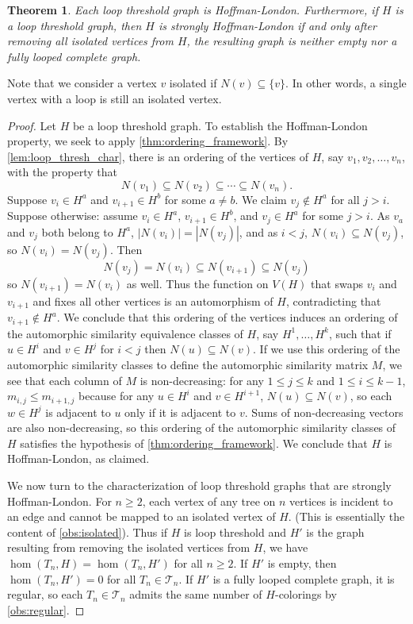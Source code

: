 \documentclass[11pt]{article}
\newtheorem{theorem}{Theorem}[section]
\theoremstyle{definition}
\begin{document}
\begin{theorem}\label{thm:loop_threshold}
Each loop threshold graph is Hoffman-London. Furthermore, if $H$ is a loop threshold graph, then $H$ is strongly Hoffman-London if and only after removing all isolated vertices from $H$, the resulting graph is neither empty nor a fully looped complete graph.
\end{theorem}

Note that we consider a vertex $v$ isolated if $N(v) \subseteq \{v\}$. In other words, a single vertex with a loop is still an isolated vertex.

\begin{proof} 
Let $H$ be a loop threshold graph. To establish the Hoffman-London property, we seek to apply \cref{thm:ordering_framework}. By \cref{lem:loop_thresh_char}, there is an ordering of the vertices of $H$, say $v_1, v_2, \ldots, v_n$, with the property that
\[N(v_1) \subseteq N(v_2) \subseteq \cdots \subseteq N(v_n).\]
Suppose $v_i \in H^a$ and $v_{i+1} \in H^b$ for some $a \ne b$. We claim $v_j \notin H^a$ for all $j > i$. Suppose otherwise: assume $v_i \in H^a$, $v_{i+1} \in H^b$, and $v_j \in H^a$ for some $j > i$. As $v_a$ and $v_j$ both belong to $H^a$, $|N(v_i)| = |N(v_j)|$, and as $i < j$, $N(v_i) \subseteq N(v_j)$, so $N(v_i) = N(v_j)$. Then
\[ N(v_j) = N(v_i) \subseteq N(v_{i+1}) \subseteq N(v_j) \]
so $N(v_{i+1}) = N(v_i)$ as well. Thus the function on $V(H)$ that swaps $v_i$ and $v_{i+1}$ and fixes all other vertices is an automorphism of $H$, contradicting that $v_{i+1} \notin H^a$. We conclude that this ordering of the vertices induces an ordering of the automorphic similarity equivalence classes of $H$, say $H^1, \ldots, H^k$, such that if $u \in H^i$ and $v \in H^j$ for $i < j$ then $N(u) \subseteq N(v)$. If we use this ordering of the automorphic similarity classes to define the automorphic similarity matrix $M$, we see that each column of $M$ is non-decreasing: for any $1 \le j \le k$ and $1 \le i \le k-1$, $m_{i,j} \le m_{i+1,j}$ because for any $u \in H^i$ and $v \in H^{i+1}$, $N(u) \subseteq N(v)$, so each $w \in H^j$ is adjacent to $u$ only if it is adjacent to $v$. Sums of non-decreasing vectors are also non-decreasing, so this ordering of the automorphic similarity classes of $H$ satisfies the hypothesis of \cref{thm:ordering_framework}. We conclude that $H$ is Hoffman-London, as claimed.

We now turn to the characterization of loop threshold graphs that are strongly Hoffman-London. For $n \ge 2$, each vertex of any tree on $n$ vertices is incident to an edge and cannot be mapped to an isolated vertex of $H$. (This is essentially the content of \cref{obs:isolated}). Thus if $H$ is loop threshold and $H'$ is the graph resulting from removing the isolated vertices from $H$, we have $\hom(T_n,H) = \hom(T_n,H')$ for all $n \ge 2$. If $H'$ is empty, then $\hom(T_n,H') = 0$ for all $T_n \in {\mathcal T}_n$. If $H'$ is a fully looped complete graph, it is regular, so each $T_n \in {\mathcal T}_n$ admits the same number of $H$-colorings by \cref{obs:regular}.


\end{proof}
\end{document}
